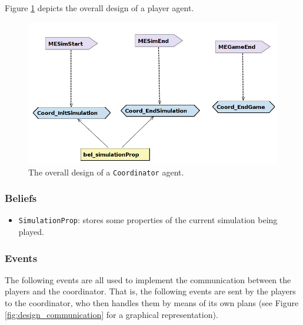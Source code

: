 \documentclass[10pt]{article}
\begin{document}
Figure \ref{fig:coordinator-design} depicts the overall design of a player
agent.

\begin{figure}[t]
\begin{center}
\includegraphics[scale=0.35]{coordinator-design}
\end{center}
\caption{The overall design of a \texttt{Coordinator} agent.}
\label{fig:coordinator-design}
\end{figure}

\subsubsection*{Beliefs}
\begin{itemize}

\item \texttt{SimulationProp}: stores some properties of the current simulation
being played.

\end{itemize}




\subsubsection*{Events}

The following events are all used to implement the communication between the players and the coordinator. That is, the following events are sent by the players to the coordinator, who then handles them by means of its own plans (see Figure \ref{fig:design_communication} for a graphical representation).
\end{document}
